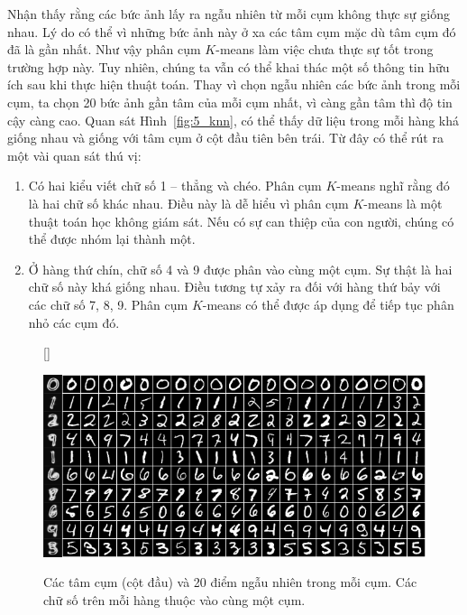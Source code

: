 Nhận thấy rằng các bức ảnh lấy ra ngẫu nhiên từ mỗi cụm không thực sự giống
nhau. Lý do có thể vì những bức ảnh này ở xa các tâm cụm mặc dù tâm cụm đó đã là
gần nhất. Như vậy phân cụm $K$-means làm việc chưa thực sự tốt trong trường hợp
này. Tuy nhiên, chúng ta vẫn có thể khai thác một số thông tin hữu ích sau khi
thực hiện thuật toán. Thay vì chọn ngẫu nhiên các bức ảnh trong mỗi cụm, ta chọn
20 bức ảnh gần tâm của mỗi cụm nhất, vì càng gần tâm thì độ tin cậy càng cao.
Quan sát Hình~\ref{fig:5_knn}, có thể thấy dữ liệu trong mỗi hàng khá giống nhau
và giống với tâm cụm ở cột đầu tiên bên trái. Từ đây có thể rút ra một vài quan
sát thú vị:

\begin{enumerate}
\item Có hai kiểu viết chữ số 1 -- thẳng và chéo. Phân cụm $K$-means
nghĩ rằng đó là hai chữ số khác nhau. Điều này là dễ hiểu vì phân cụm $K$-means
là một thuật toán học không giám sát. Nếu có sự can thiệp của
con người, chúng có thể được nhóm lại thành một.


\item Ở hàng thứ chín, chữ số 4 và 9 được phân vào cùng một cụm. Sự
thật là hai chữ số này khá giống nhau. Điều tương tự xảy ra đối với
hàng thứ bảy với các chữ số 7, 8, 9. Phân cụm $K$-means có thể được áp dụng để tiếp tục phân nhỏ các cụm đó.

\end{enumerate}

\begin{figure}[t]
[\FBwidth]
{\caption{
Các tâm cụm (cột đầu) và 20 điểm {ngẫu nhiên} trong mỗi cụm. Các chữ số trên mỗi hàng thuộc vào cùng một cụm.
}
\label{fig:5_random}}
{ %
\includegraphics[width=.65\textwidth]{Chapters/03_SimpleML/4_kmeans/kmeans_random_gray.png}
}
\end{figure}

